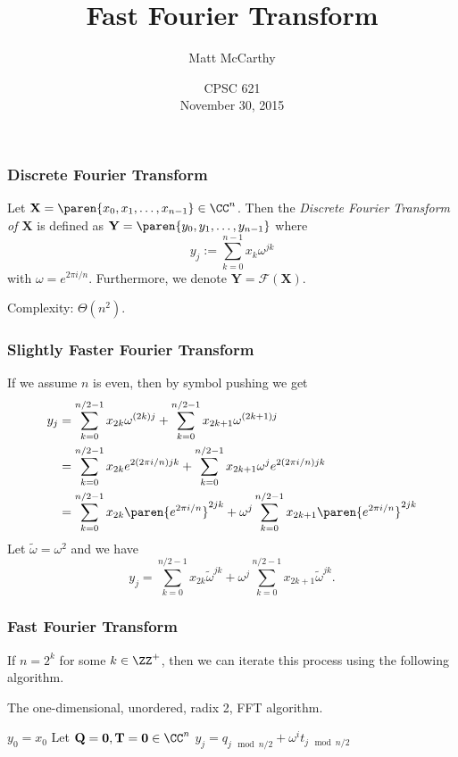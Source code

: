 \documentclass[xcolor=pdftex,dvipsnames,table]{presentation}
\def\ft{\mathcal{F}}
\begin{document}
\title[Fast Fourier Transform]
{
	Fast Fourier Transform
}
\author[McCarthy]
{
	Matt McCarthy
}
\date[]
{
	CPSC 621\\
	November 30, 2015
}

\frame{\titlepage}

\begin{frame}
	\frametitle{Discrete Fourier Transform}

	\begin{definition}
		Let $\mathbf{X}=\paren{x_0,x_1,\ldots,x_{n-1}}\in\CC^n$.
		Then the \textit{Discrete Fourier Transform of $\mathbf{X}$} is defined as $\mathbf{Y}=\paren{y_0,y_1,\ldots,y_{n-1}}$ where
		\[
			y_j:=\sum_{k=0}^{n-1}x_k \omega^{jk}
		\]
		with $\omega=e^{2\pi i/n}$.
		Furthermore, we denote $\mathbf{Y}=\ft(\mathbf{X})$.
	\end{definition}
	\pause{}
	Complexity: $\Theta(n^2)$.
\end{frame}

\begin{frame}
	\frametitle{Slightly Faster Fourier Transform}
	If we assume $n$ is even, then by symbol pushing we get
	\begin{align*}
		y_j &=\sum_{k=0}^{n/2-1}x_{2k} \omega^{(2k)j} + \sum_{k=0}^{n/2-1}x_{2k+1}\omega^{(2k+1)j}\\
		&= \sum_{k=0}^{n/2-1}x_{2k} e^{2(2\pi i/n)jk} + \sum_{k=0}^{n/2-1}x_{2k+1}\omega^{j}e^{2(2\pi i/n)jk}\\
		&= \sum_{k=0}^{n/2-1}x_{2k} \paren{e^{2\pi i/n}}^{2jk} + \omega^{j}\sum_{k=0}^{n/2-1}x_{2k+1}\paren{e^{2\pi i/n}}^{2jk}
	\end{align*}
	\pause{}
	Let $\tilde{\omega}=\omega^2$ and we have
	\[
		y_j = \sum_{k=0}^{n/2-1}x_{2k} {\tilde{\omega}}^{jk} + \omega^{j}\sum_{k=0}^{n/2-1}x_{2k+1}{\tilde{\omega}}^{jk}.
	\]
\end{frame}

\begin{frame}
	\frametitle{Fast Fourier Transform}

	If $n=2^k$ for some $k\in\ZZ^+$, then we can iterate this process using the following algorithm.

	\pause
	The one-dimensional, unordered, radix 2, FFT algorithm.
	\begin{algorithmic}[1]
				\State $y_0=x_0$
			\Else
				\State Let $\mathbf{Q}=\mathbf{0},\mathbf{T}=\mathbf{0}\in\CC^n$
				\State {}
				\State {}
					\State $y_j=q_{j\mod{n/2}}+\omega^i t_{j\mod{n/2}}$
				\EndFor
			\EndIf
		\EndFunction
	\end{algorithmic}
\end{frame}
\end{document}
